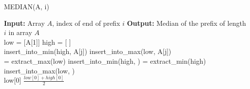 \documentclass[11pt, a4paper]{article}
\begin{document}
\begin{algorithm} [H]
\caption{MEDIAN(A, i)}
\begin{algorithmic}[1]
\State \textbf{Input:} Array \( A \), index of end of prefix \( i \)
\State \textbf{Output:} Median of the prefix of length \( i \) in array \( A \)
\\
\State low = [A[1]] 
\State high = [ ]
\\
        \State insert\_into\_min(high, A[j])
    \Else
        \State insert\_into\_max(low, A[j])
    \EndIf
    \\
        \State {} = extract\_max(low)
        \State insert\_into\_min(high, )
        \State {} = extract\_min(high)
        \State insert\_into\_max(low, )
    \EndIf
\EndFor
\\
    \State \Return low[0]
\Else
    \State \Return $\frac{low[0] + high[0]}{2}$
\EndIf

\end{algorithmic}
\end{algorithm}
\end{document}
